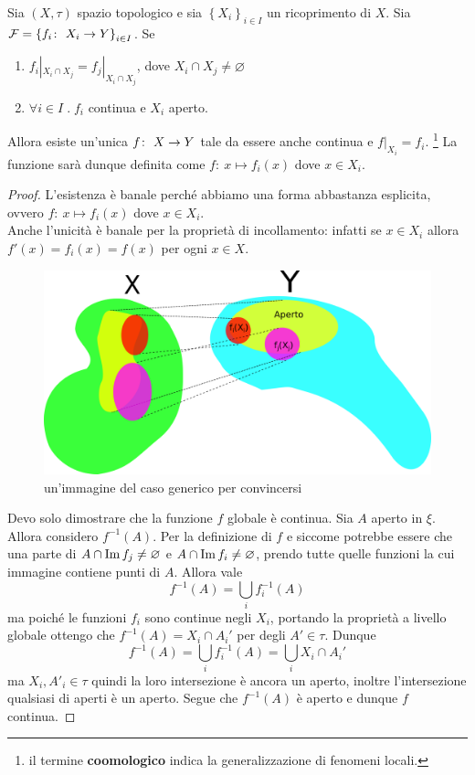 \begin{theorem}
	Sia $(X,\tau)$ spazio topologico e sia $\left\{X_i\right\}_{i \in I}$ un ricoprimento di $X$. Sia $\mathcal{F} = \left\{ f_i \colon\ X_i \rightarrow Y\right\}_{i \in I}$. Se 
	\begin{enumerate}
		\item $f_i|_{X_i \cap X_j} = f_j|_{X_i \cap X_j}$, dove $X_i \cap X_j \neq \varnothing$
		\item $\forall i \in I \; . \; f_i$ continua e $X_i$ aperto.
	\end{enumerate}
	Allora esiste un'unica $f \colon\ X \rightarrow Y$ tale da essere anche continua e $f|_{X_i} = f_i$. \footnote{il termine \textbf{coomologico} indica la generalizzazione di fenomeni locali.}
	La funzione sarà dunque definita come $f \colon\ x \mapsto f_i(x)$ dove $x \in X_i$.
\end{theorem}
\begin{proof}
	L'esistenza è banale perché abbiamo una forma abbastanza esplicita, ovvero $f \colon\ x \mapsto f_i(x)$ dove $x \in X_i$. \\ Anche l'unicità è banale per la proprietà di incollamento: infatti se $x \in X_i$ allora $f'(x) = f_i(x) = f(x)$ per ogni $x \in X$.
	
	\begin{figure}[h!]
		\centering
		\includegraphics[width=0.6\linewidth]{images/topologia_generale/Coomology_exercises_figure}
		\caption{un'immagine del caso generico per convincersi}
		\label{fig:coomologyexercisesfigure}
	\end{figure}
	Devo solo dimostrare che la funzione $f$ globale è continua.
	Sia $A$ aperto in $\xi$. Allora considero $f^{-1}(A)$. Per la definizione di $f$ e siccome potrebbe essere che una parte di $A \cap \operatorname{Im}{f_j} \neq \varnothing$ e $A \cap \operatorname{Im}{f_i} \neq \varnothing$, prendo tutte quelle funzioni la cui immagine contiene punti di $A$. Allora vale 
	\begin{equation*}
		f^{-1}(A) = \bigcup_{i} f_i^{-1}(A) 
	\end{equation*}
	ma poiché le funzioni $f_i$ sono continue negli $X_i$, portando la proprietà a livello globale ottengo che $f^{-1}(A) = X_i \cap A_i'$ per degli $A' \in \tau$. Dunque 
	\begin{equation*}
		f^{-1}(A) = \bigcup_{i} f_i^{-1}(A) = \bigcup_{i} X_i \cap A_i' 
	\end{equation*}
	ma $X_i, A'_i \in \tau$ quindi la loro intersezione è ancora un aperto, inoltre l'intersezione qualsiasi di aperti è un aperto. Segue che $f^{-1}(A)$ è aperto e dunque $f$ continua.
\end{proof}



